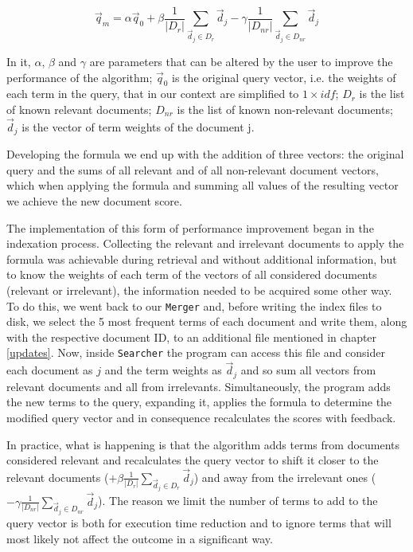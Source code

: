 \documentclass[12pt]{article}
\begin{document}
\vspace{-10pt}
\begin{equation}
  \vec{q}_{m} = \alpha\vec{q}_{0} + \beta\frac{1}{|D_{r}|} \sum_{ \vec{d}_{j} \in D_{r}} \vec{d}_{j} - \gamma\frac{1}{|D_{nr}|} \sum_{ \vec{d}_{j} \in D_{nr}} \vec{d}_{j}
\end{equation}
 
In it, $\alpha$, $\beta$ and $\gamma$ are parameters that can be altered by the 
user to improve the performance of the algorithm;
$\vec{q}_{0}$ is the original query vector, i.e. the weights of each term 
in the query, that in our context are simplified to $1 \times idf$; 
$D_{r}$ is the list of known relevant documents;
$D_{nr}$ is the list of known non-relevant documents; 
$\vec{d}_{j}$ is the vector of term weights of the document j.

Developing the formula we end up with the addition of three vectors: 
the original query and the sums of all relevant and of all non-relevant document 
vectors, which when applying the formula and summing all values of the resulting 
vector we achieve the new document score.

\newpage
The implementation of this form of performance improvement began in the indexation
process.
Collecting the relevant and irrelevant documents to apply the formula was achievable
during retrieval and without additional information, but to know the weights of
each term of the vectors of all considered documents (relevant or irrelevant), 
the information needed to be acquired some other way.
To do this, we went back to our \texttt{Merger} and, before writing the index 
files to disk, we select the 5 most frequent terms of each document and write 
them, along with the respective document ID, to an additional file mentioned in
chapter \ref{updates}.
Now, inside \texttt{Searcher} the program can access this file and consider each
document as $j$ and the term weights as $\vec{d}_{j}$ and so sum all vectors from 
relevant documents and all from irrelevants. 
Simultaneously, the program adds the new terms to the query, expanding it, 
applies the formula to determine the modified query vector and in consequence
recalculates the scores with feedback.

In practice, what is happening is that the algorithm adds terms from documents 
considered relevant and recalculates the query vector to shift it closer to 
the relevant documents ($+ \beta \frac{1}{|D_{r}|} \sum_{ \vec{d}_{j} \in D_{r}} \vec{d}_{j}$)
and away from the irrelevant ones ($- \gamma \frac{1}{|D_{nr}|} \sum_{ \vec{d}_{j} \in D_{nr}} \vec{d}_{j}$).
The reason we limit the number of terms to add to the query vector is both for 
execution time reduction and to ignore terms that will most likely not affect the 
outcome in a significant way.
\end{document}
